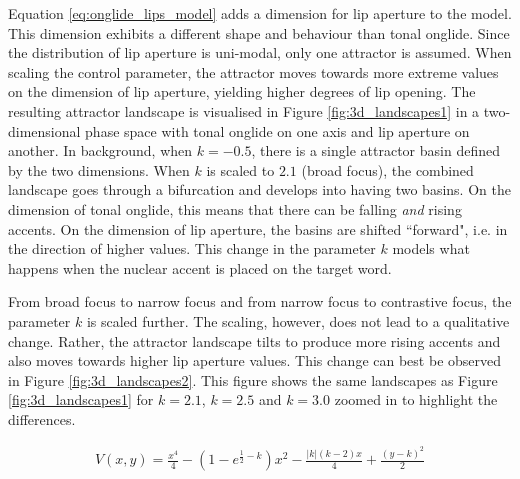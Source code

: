 Equation \ref{eq:onglide_lips_model} adds a dimension for lip aperture to the model. This dimension exhibits a different shape and behaviour than tonal onglide. Since the distribution of lip aperture is uni-modal, only one attractor is assumed. When scaling the control parameter, the attractor moves towards more extreme values on the dimension of lip aperture, yielding higher degrees of lip opening. The resulting attractor landscape is visualised in Figure \ref{fig:3d_landscapes1} in a two-dimensional phase space with tonal onglide on one axis and lip aperture on another. In background, when $k=-0.5$, there is a single attractor basin defined by the two dimensions. When $k$ is scaled to $2.1$ (broad focus), the combined landscape goes through a bifurcation and develops into having two basins. On the dimension of tonal onglide, this means that there can be falling \emph{and} rising accents. On the dimension of lip aperture, the basins are shifted ``forward", i.e. in the direction of higher values. This change in the parameter $k$ models what happens when the nuclear accent is placed on the target word. 

From broad focus to narrow focus and from narrow focus to contrastive focus, the parameter $k$ is scaled further. The scaling, however, does not lead to a qualitative change. Rather, the attractor landscape tilts to produce more rising accents and also moves towards higher lip aperture values. This change can best be observed in Figure \ref{fig:3d_landscapes2}. This figure shows the same landscapes as Figure \ref{fig:3d_landscapes1} for $k = 2.1$, $k = 2.5$ and $k = 3.0$ zoomed in to highlight the differences.

\begin{equation}
\begin{split}
V(x,y) = \frac{x^4}{4} - (1-e^{\frac{1}{2}-k})x^2 - \frac{|k|(k-2)x}{4} + \frac{(y-k)^2}{2}
\label{eq:onglide_lips_model}
\end{split}
\end{equation}

